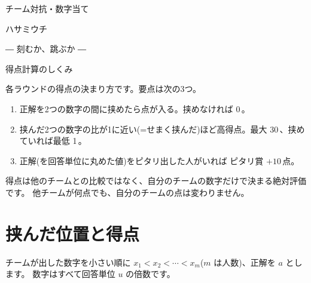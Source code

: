\documentclass[a4paper,10.5pt]{ltjsarticle}
\newcommand{\hv}{\heavy\heavylatin}
\newcommand{\pt}[1]{#1\,\text{点}}
\newcommand{\term}[1]{{\gbold #1}}
\begin{document}
\thispagestyle{empty}
\noindent
{\gbold\color{accent}\large チーム対抗・数字当て}\par\vspace{1mm}
\noindent
{\hv\fontsize{40pt}{44pt}\selectfont ハサミウチ}\par\vspace{1.5mm}
\noindent
{\hv\Large\color{accent}― 刻むか、跳ぶか ―}\par\vspace{4mm}
\noindent{\color{ink}\rule{\linewidth}{3pt}}\par\vspace{1.5mm}
\noindent
{\hv\Large 得点計算のしくみ}\hfill\par
\vspace{4mm}

\noindent
各ラウンドの得点の決まり方です。要点は次の3つ。

\begin{keybox}
\begin{enumerate}[leftmargin=2\zw,label={\hv\color{accent}\arabic*.}]
  \item 正解を\term{2つの数字の間に挟めた}ら点が入る。挟めなければ \pt{0}。
  \item 挟んだ2つの数字の\term{比}が1に近い(=せまく挟んだ)ほど高得点。最大 \pt{30}、挟めていれば最低 \pt{1}。
  \item 正解(を回答単位に丸めた値)をピタリ出した人がいれば \term{ピタリ賞 $+\pt{10}$}。
\end{enumerate}
\end{keybox}

\noindent
得点は\term{他のチームとの比較ではなく、自分のチームの数字だけで決まる絶対評価}です。
他チームが何点でも、自分のチームの点は変わりません。

\section{挟んだ位置と得点}

チームが出した数字を小さい順に $x_1 < x_2 < \cdots < x_m$($m$ は人数)、正解を $a$ とします。
数字はすべて回答単位 $u$ の倍数です。
\end{document}
